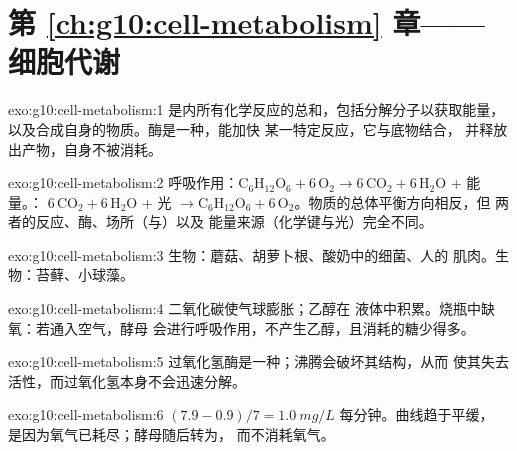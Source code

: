 \section*{第 \ref{ch:g10:cell-metabolism} 章——细胞代谢}

\begin{solution}{exo:g10:cell-metabolism:1}
是内所有化学反应的总和，包括分解分子以获取能量，
以及合成自身的物质。酶是一种，能加快
某一特定反应，它与底物结合，
并释放出产物，自身不被消耗。
\end{solution}

\begin{solution}{exo:g10:cell-metabolism:2}
呼吸作用：$\mathrm{C_6H_{12}O_6} + 6\,\mathrm{O_2} \to
6\,\mathrm{CO_2} + 6\,\mathrm{H_2O}$ + 能量。：
$6\,\mathrm{CO_2} + 6\,\mathrm{H_2O}$ + 光 $\to \mathrm{C_6H_{12}O_6}
+ 6\,\mathrm{O_2}$。物质的总体平衡方向相反，但
两者的反应、酶、场所（与）以及
能量来源（化学键与光）完全不同。
\end{solution}

\begin{solution}{exo:g10:cell-metabolism:3}
生物：蘑菇、胡萝卜根、酸奶中的细菌、人的
肌肉。生物：苔藓、小球藻。
\end{solution}

\begin{solution}{exo:g10:cell-metabolism:4}
二氧化碳使气球膨胀；乙醇在
液体中积累。烧瓶中缺氧：若通入空气，酵母
会进行呼吸作用，不产生乙醇，且消耗的糖少得多。
\end{solution}

\begin{solution}{exo:g10:cell-metabolism:5}
过氧化氢酶是一种；沸腾会破坏其结构，从而
使其失去活性，而过氧化氢本身不会迅速分解。
\end{solution}

\begin{solution}{exo:g10:cell-metabolism:6}
$(7.9 - 0.9)/7 = \qty{1.0}{mg/L}$ 每分钟。曲线趋于平缓，
是因为氧气已耗尽；酵母随后转为，
而不消耗氧气。
\end{solution}

